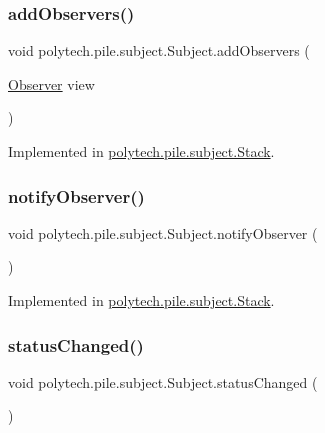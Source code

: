 \subsubsection{\texorpdfstring{add\+Observers()}{addObservers()}}
{\footnotesize\ttfamily void polytech.\+pile.\+subject.\+Subject.\+add\+Observers (\begin{DoxyParamCaption}\item[{\hyperlink{interfacepolytech_1_1pile_1_1observers_1_1_observer}{Observer}}]{view }\end{DoxyParamCaption})}



Implemented in \hyperlink{classpolytech_1_1pile_1_1subject_1_1_stack_a705c6023868cbd440d87b04cfe7cbd85}{polytech.\+pile.\+subject.\+Stack}.

\hypertarget{interfacepolytech_1_1pile_1_1subject_1_1_subject_a4ae5fcf71f744b2f086d172e5922bc0d}{}\label{interfacepolytech_1_1pile_1_1subject_1_1_subject_a4ae5fcf71f744b2f086d172e5922bc0d} 
\subsubsection{\texorpdfstring{notify\+Observer()}{notifyObserver()}}
{\footnotesize\ttfamily void polytech.\+pile.\+subject.\+Subject.\+notify\+Observer (\begin{DoxyParamCaption}{ }\end{DoxyParamCaption})}



Implemented in \hyperlink{classpolytech_1_1pile_1_1subject_1_1_stack_a370de235d9d913914a2c46035f9b9465}{polytech.\+pile.\+subject.\+Stack}.

\hypertarget{interfacepolytech_1_1pile_1_1subject_1_1_subject_a9bc972b992f152734a3b40cda13dc4d7}{}\label{interfacepolytech_1_1pile_1_1subject_1_1_subject_a9bc972b992f152734a3b40cda13dc4d7} 
\subsubsection{\texorpdfstring{status\+Changed()}{statusChanged()}}
{\footnotesize\ttfamily void polytech.\+pile.\+subject.\+Subject.\+status\+Changed (\begin{DoxyParamCaption}{ }\end{DoxyParamCaption})}



